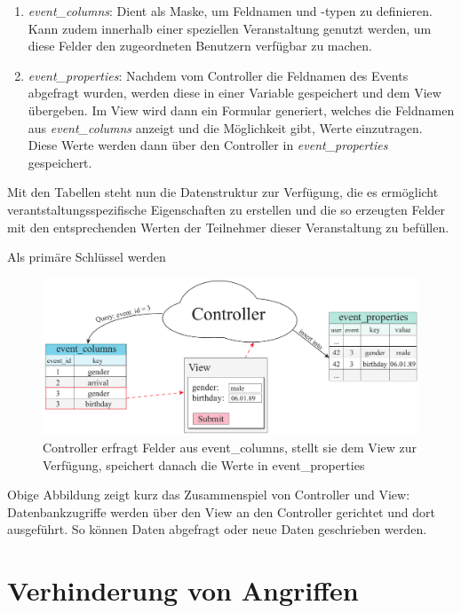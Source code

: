 \begin{enumerate} 
	\item \emph{event\_columns}: Dient als Maske, um Feldnamen und -typen zu definieren. Kann zudem innerhalb einer speziellen Veranstaltung genutzt werden, um diese Felder den zugeordneten Benutzern verfügbar zu machen.
	\item \emph{event\_properties}: Nachdem vom Controller die Feldnamen des Events abgefragt wurden, werden diese in einer Variable gespeichert und dem View übergeben. Im View wird dann ein Formular generiert, welches die Feldnamen aus \emph{event\_columns} anzeigt und die Möglichkeit gibt, Werte einzutragen. Diese Werte werden dann über den Controller in \emph{event\_properties} gespeichert.
\end{enumerate}

Mit den Tabellen steht nun die Datenstruktur zur Verfügung, die es ermöglicht verantstaltungsspezifische Eigenschaften zu erstellen und die so erzeugten Felder mit den entsprechenden Werten der Teilnehmer dieser Veranstaltung zu befüllen.\par

Als primäre Schlüssel werden

\begin{figure}[!ht]
	\centering
	\includegraphics[width=15cm]{fig/event_properties}
	\caption[Speichern von spez. Feldern in die Datenbank]{Controller erfragt Felder aus event\_columns, stellt sie dem View zur Verfügung, speichert danach die Werte in event\_properties}
\end{figure}

Obige Abbildung zeigt kurz das Zusammenspiel von Controller und View: Datenbankzugriffe werden über den View an den Controller gerichtet und dort ausgeführt. So können Daten abgefragt oder neue Daten geschrieben werden.

\section{Verhinderung von Angriffen}
